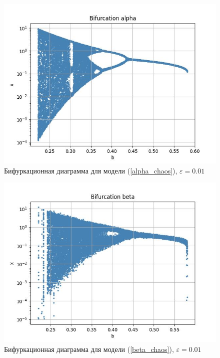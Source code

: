         \begin{figure}
            \centering
            \includegraphics[width=\textwidth]{stochastic/images/bifurcation_x_0_2_a_1_compare_alpha_noise.jpg}
        
            \captionsetup{justification=centering}
            \caption{Бифуркационная диаграмма для модели (\ref{alpha_chaos}), \(\varepsilon = 0.01\)}
            \label{bifurcation_x_0_2_a_1_compare_alpha_noise}
        \end{figure}

        \begin{figure}
            \centering
            \includegraphics[width=\textwidth]{stochastic/images/bifurcation_x_0_2_a_1_compare_beta_noise.jpg}
        
            \captionsetup{justification=centering}
            \caption{Бифуркационная диаграмма для модели (\ref{beta_chaos}), \(\varepsilon = 0.01\)}
            \label{bifurcation_x_0_2_a_1_compare_beta_noise}
        \end{figure}

